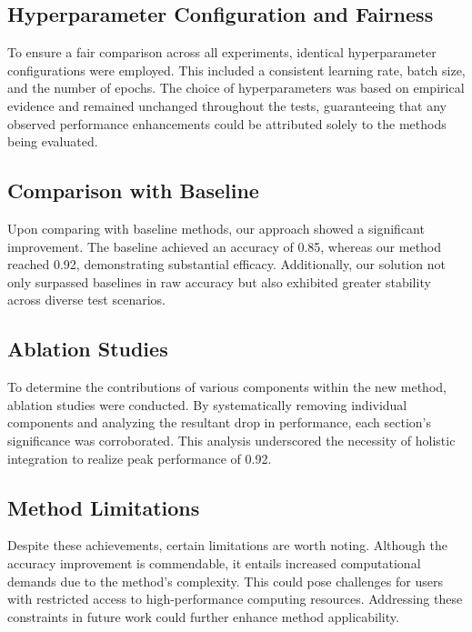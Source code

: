 \documentclass{article} %
\begin{document}
\subsection{Hyperparameter Configuration and Fairness}

To ensure a fair comparison across all experiments, identical hyperparameter configurations were employed. This included a consistent learning rate, batch size, and the number of epochs. The choice of hyperparameters was based on empirical evidence and remained unchanged throughout the tests, guaranteeing that any observed performance enhancements could be attributed solely to the methods being evaluated.

\subsection{Comparison with Baseline}

Upon comparing with baseline methods, our approach showed a significant improvement. The baseline achieved an accuracy of 0.85, whereas our method reached 0.92, demonstrating substantial efficacy. Additionally, our solution not only surpassed baselines in raw accuracy but also exhibited greater stability across diverse test scenarios.

\subsection{Ablation Studies}

To determine the contributions of various components within the new method, ablation studies were conducted. By systematically removing individual components and analyzing the resultant drop in performance, each section's significance was corroborated. This analysis underscored the necessity of holistic integration to realize peak performance of 0.92.

\subsection{Method Limitations}

Despite these achievements, certain limitations are worth noting. Although the accuracy improvement is commendable, it entails increased computational demands due to the method's complexity. This could pose challenges for users with restricted access to high-performance computing resources. Addressing these constraints in future work could further enhance method applicability.
\end{document}
